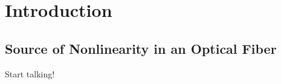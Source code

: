 
\renewcommand{\thechapter}{1}

\chapter{Introduction}

\section{Source of Nonlinearity in an Optical Fiber}

Start talking!


